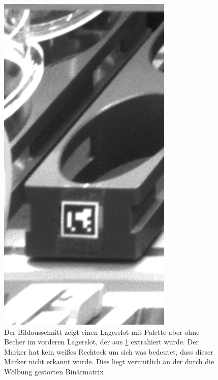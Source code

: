     \begin{figure}
        \caption[Bildzuschnitt einer Lagersektion und weitere Unterteilung in die Bereiche für Becher und Palette.]
        {\small Der Bildausschnitt zeigt einen Lagerslot mit Palette aber ohne Becher im vorderen Lagerslot, der aus \ref{fig:figure15} extrahiert wurde. Der Marker hat kein weißes Rechteck um sich was bedeutet, dass dieser Marker nicht erkannt wurde. Dies liegt vermutlich an der durch die Wölbung gestörten Binärmatrix}\label{fig:figure15}
        \includegraphics*[width = \textwidth/3]{Bilder/section_16.png}
        \centering
    \end{figure}


